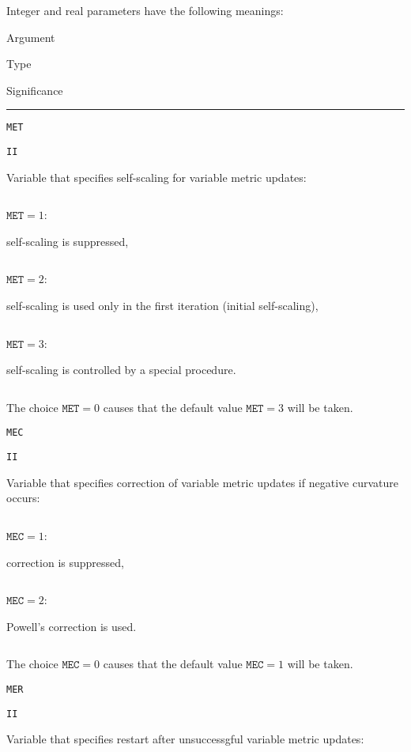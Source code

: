 \documentclass{article}
\begin{document}
Integer and real parameters have the following meanings:

\vspace{2mm}

{\small

\noindent\parbox{20mm}{Argument}\parbox{10mm}{$\!$Type}\parbox[t]{91mm}
  {Significance}\par\noindent\rule[1mm]{121mm}{.4pt}
  \par
\noindent\parbox{20mm}{\texttt{MET}}\parbox{10mm}{\texttt{II}}\parbox[t]{91mm}{
  Variable that specifies self-scaling for variable metric updates:}
  \par\vspace{1mm}
\noindent\parbox{30mm}{$\;$}\parbox{20mm}{$\texttt{MET}=1$:}\parbox[t]{71mm}{
  self-scaling is suppressed,}
  \par
\noindent\parbox{30mm}{$\;$}\parbox{20mm}{$\texttt{MET}=2$:}\parbox[t]{71mm}{
  self-scaling is used only in the first iteration (initial self-scaling),}
  \par
\noindent\parbox{30mm}{$\;$}\parbox{20mm}{$\texttt{MET}=3$:}\parbox[t]{71mm}{
  self-scaling is controlled by a special procedure.}
  \par\vspace{1mm}
\noindent\parbox{30mm}{$\;$}\parbox[t]{91mm}{The choice $\texttt{MET}=0$
  causes that the default value $\texttt{MET}=3$ will be taken.}
  \par\vspace{2mm}
\noindent\parbox{20mm}{\texttt{MEC}}\parbox{10mm}{\texttt{II}}\parbox[t]{91mm}{
  Variable that specifies correction of variable metric updates if negative
  curvature occurs:}
  \par\vspace{1mm}
\noindent\parbox{30mm}{$\;$}\parbox{20mm}{$\texttt{MEC}=1$:}\parbox[t]{71mm}{
  correction is suppressed,}
  \par
\noindent\parbox{30mm}{$\;$}\parbox{20mm}{$\texttt{MEC}=2$:}\parbox[t]{71mm}{
  Powell's correction is used.}
  \par\vspace{1mm}
\noindent\parbox{30mm}{$\;$}\parbox[t]{91mm}{The choice $\texttt{MEC}=0$
  causes that the default value $\texttt{MEC}=1$ will be taken.}
  \par\vspace{2mm}
\noindent\parbox{20mm}{\texttt{MER}}\parbox{10mm}{\texttt{II}}\parbox[t]{91mm}{
  Variable that specifies restart after unsuccessgful variable metric updates:}
  \par\vspace{1mm}
}
\end{document}
